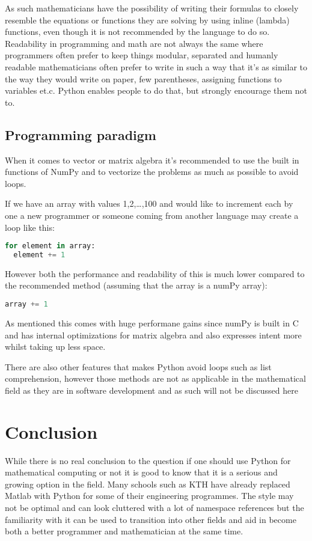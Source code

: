 \documentclass{article}
\begin{document}
As such mathematicians have the possibility of writing their formulas to closely resemble the equations or functions they are solving
by using inline (lambda) functions, even though it is not recommended by the language to do so. Readability in programming and math are
not always the same where programmers often prefer to keep things modular, separated and humanly readable mathematicians often prefer
to write in such a way that it's as similar to the way they would write on paper, few parentheses, assigning functions to variables et.c.
Python enables people to do that, but strongly encourage them not to.

\subsection{Programming paradigm}
When it comes to vector or matrix algebra it's recommended to use the built in functions of NumPy and to vectorize the problems
as much as possible to avoid loops.

If we have an array with values 1,2,\ldots,100 and would like to increment each by one a new programmer or someone coming from another
language may create a loop like this:
\begin{lstlisting}[language=Python]
for element in array:
  element += 1
\end{lstlisting}
However both the performance and readability of this is much lower compared to the recommended method (assuming that the array is a
numPy array):
\begin{lstlisting}[language=Python]
array += 1
\end{lstlisting}

As mentioned this comes with huge performane gains since numPy is built in C and has internal optimizations for matrix algebra and also
expresses intent more whilst taking up less space.

There are also other features that makes Python avoid loops such as list comprehension, however those methods are not as applicable
in the mathematical field as they are in software development and as such will not be discussed here




\section{Conclusion}%
While there is no real conclusion to the question if one should use Python for mathematical computing or not it is good to know that
it is a serious and growing option in the field. Many schools such as KTH have already replaced Matlab with Python for some of their
engineering programmes. The style may not be optimal and can look cluttered with a lot of namespace references but the familiarity with
it can be used to transition into other fields and aid in become both a better programmer and mathematician at the same time.
\end{document}

